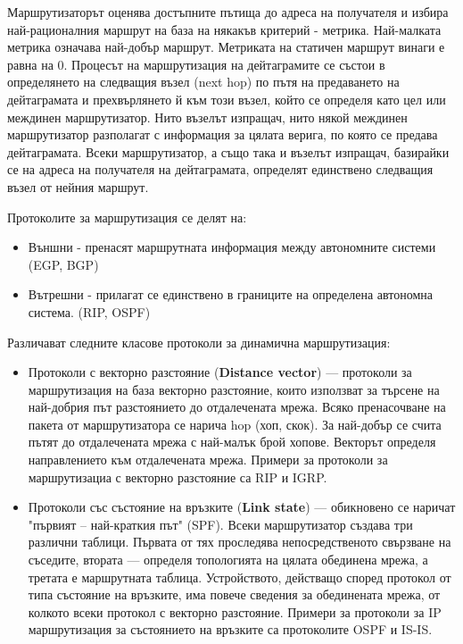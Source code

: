 \documentclass{article}
\begin{document}
Маршрутизаторът оценява достъпните пътища до адреса на получателя и избира най-рационалния маршрут на база на някакъв критерий - метрика.
Най-малката метрика означава най-добър маршрут. Метриката на статичен маршрут винаги е равна на 0.
Процесът на маршрутизация на дейтаграмите се състои в определянето на следващия възел (next hop) по пътя на предаването на
дейтаграмата и прехвърлянето й към този възел, който се определя като цел или междинен маршрутизатор. Нито възелът изпращач, нито
някой междинен маршрутизатор разполагат с информация за цялата верига, по която се предава дейтаграмата. Всеки маршрутизатор,
а също така и възелът изпращач, базирайки се на адреса на получателя на дейтаграмата, определят единствено следващия възел от нейния маршрут.

Протоколите за маршрутизация се делят на:
\begin{itemize}
    \item Външни - пренасят маршрутната информация между автономните системи (EGP, BGP)
    \item Вътрешни - прилагат се единствено в границите на определена автономна система. (RIP, OSPF)
\end{itemize}

Различават следните класове протоколи за динамична маршрутизация:
\begin{itemize}
    \item Протоколи с векторно разстояние (\textbf{Distance vector}) — протоколи за маршрутизация на база векторно разстояние, които
    използват за търсене на най-добрия път разстоянието до отдалечената мрежа. Всяко пренасочване на пакета от маршрутизатора се
    нарича hop (хоп, скок). За най-добър се счита пътят до отдалечената мрежа с най-малък брой хопове. Векторът определя
    направлението към отдалечената мрежа. Примери за протоколи за маршрутизациа с векторно разстояние са RIP и IGRP.
    \item Протоколи със състояние на връзките (\textbf{Link state}) — обикновено се наричат "първият – най-краткия път" (SPF). Всеки
    маршрутизатор създава три различни таблици. Първата от тях проследява непосредственото свързване на съседите, втората —
    определя топологията на цялата обединена мрежа, а третата е маршрутната таблица. Устройството, действащо според протокол от
    типа състояние на връзките, има повече сведения за обединената мрежа, от колкото всеки протокол с векторно разстояние.
    Примери за протоколи за IP маршрутизация за състоянието на връзките са протоколите OSPF и IS-IS.
\end{itemize}
\end{document}
